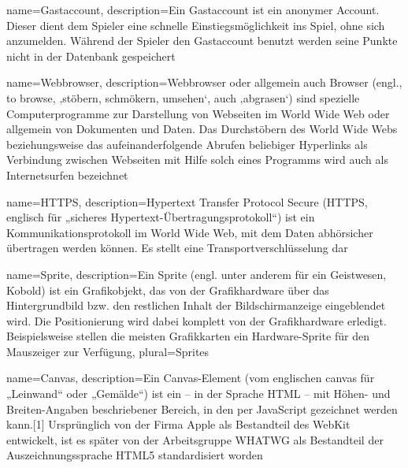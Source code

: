 
{
    name=Gastaccount,
    description={Ein Gastaccount ist ein anonymer Account. Dieser dient dem Spieler eine schnelle Einstiegsmöglichkeit ins Spiel, ohne sich anzumelden. Während der Spieler den Gastaccount benutzt werden seine Punkte nicht in der Datenbank gespeichert}
}

{
    name=Webbrowser,
    description={Webbrowser oder allgemein auch Browser (engl., to browse, ‚stöbern, schmökern, umsehen‘, auch ‚abgrasen‘) sind spezielle Computerprogramme zur Darstellung von Webseiten im World Wide Web oder allgemein von Dokumenten und Daten. Das Durchstöbern des World Wide Webs beziehungsweise das aufeinanderfolgende Abrufen beliebiger Hyperlinks als Verbindung zwischen Webseiten mit Hilfe solch eines Programms wird auch als Internetsurfen bezeichnet}
}

{
    name=HTTPS,
    description={Hypertext Transfer Protocol Secure (HTTPS, englisch für „sicheres Hypertext-Übertragungsprotokoll“) ist ein Kommunikationsprotokoll im World Wide Web, mit dem Daten abhörsicher übertragen werden können. Es stellt eine Transportverschlüsselung dar}
}

{
    name=Sprite,
    description={Ein Sprite (engl. unter anderem für ein Geistwesen, Kobold) ist ein Grafikobjekt, das von der Grafikhardware über das Hintergrundbild bzw. den restlichen Inhalt der Bildschirmanzeige eingeblendet wird. Die Positionierung wird dabei komplett von der Grafikhardware erledigt. Beispielsweise stellen die meisten Grafikkarten ein Hardware-Sprite für den Mauszeiger zur Verfügung},
    plural={Sprites}
}

{
    name=Canvas,
    description={Ein Canvas-Element (vom englischen canvas für „Leinwand“ oder „Gemälde“) ist ein – in der Sprache HTML – mit Höhen- und Breiten-Angaben beschriebener Bereich, in den per JavaScript gezeichnet werden kann.[1] Ursprünglich von der Firma Apple als Bestandteil des WebKit entwickelt, ist es später von der Arbeitsgruppe WHATWG als Bestandteil der Auszeichnungssprache HTML5 standardisiert worden}
}

